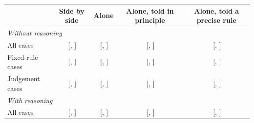 \begin{table}[t]
\centering
\footnotesize
\begin{tabular}{lcccc}
\toprule
 & Side by side & Alone & Alone, told in principle & Alone, told a precise rule \\
\midrule
\multicolumn{5}{l}{\textit{Without reasoning}} \\
All cases & \FirstSessionSideBySideNoReasoning{}\,{\scriptsize[\FirstSessionSideBySideNoReasoningLo{}, \FirstSessionSideBySideNoReasoningHi{}]} & \FirstSessionAloneNoReasoning{}\,{\scriptsize[\FirstSessionAloneNoReasoningLo{}, \FirstSessionAloneNoReasoningHi{}]} & \FirstSessionToldPrincipleNoReasoning{}\,{\scriptsize[\FirstSessionToldPrincipleNoReasoningLo{}, \FirstSessionToldPrincipleNoReasoningHi{}]} & \FirstSessionToldRuleNoReasoning{}\,{\scriptsize[\FirstSessionToldRuleNoReasoningLo{}, \FirstSessionToldRuleNoReasoningHi{}]} \\
Fixed-rule cases & \FirstSessionSideBySideNoReasoningFixedRule{}\,{\scriptsize[\FirstSessionSideBySideNoReasoningFixedRuleLo{}, \FirstSessionSideBySideNoReasoningFixedRuleHi{}]} & \FirstSessionAloneNoReasoningFixedRule{}\,{\scriptsize[\FirstSessionAloneNoReasoningFixedRuleLo{}, \FirstSessionAloneNoReasoningFixedRuleHi{}]} & \FirstSessionToldPrincipleNoReasoningFixedRule{}\,{\scriptsize[\FirstSessionToldPrincipleNoReasoningFixedRuleLo{}, \FirstSessionToldPrincipleNoReasoningFixedRuleHi{}]} & \FirstSessionToldRuleNoReasoningFixedRule{}\,{\scriptsize[\FirstSessionToldRuleNoReasoningFixedRuleLo{}, \FirstSessionToldRuleNoReasoningFixedRuleHi{}]} \\
Judgement cases & \FirstSessionSideBySideNoReasoningJudgement{}\,{\scriptsize[\FirstSessionSideBySideNoReasoningJudgementLo{}, \FirstSessionSideBySideNoReasoningJudgementHi{}]} & \FirstSessionAloneNoReasoningJudgement{}\,{\scriptsize[\FirstSessionAloneNoReasoningJudgementLo{}, \FirstSessionAloneNoReasoningJudgementHi{}]} & \FirstSessionToldPrincipleNoReasoningJudgement{}\,{\scriptsize[\FirstSessionToldPrincipleNoReasoningJudgementLo{}, \FirstSessionToldPrincipleNoReasoningJudgementHi{}]} & \FirstSessionToldRuleNoReasoningJudgement{}\,{\scriptsize[\FirstSessionToldRuleNoReasoningJudgementLo{}, \FirstSessionToldRuleNoReasoningJudgementHi{}]} \\
\multicolumn{5}{l}{\textit{With reasoning}} \\
All cases & \FirstSessionSideBySideReasoning{}\,{\scriptsize[\FirstSessionSideBySideReasoningLo{}, \FirstSessionSideBySideReasoningHi{}]} & \FirstSessionAloneReasoning{}\,{\scriptsize[\FirstSessionAloneReasoningLo{}, \FirstSessionAloneReasoningHi{}]} & \FirstSessionToldPrincipleReasoning{}\,{\scriptsize[\FirstSessionToldPrincipleReasoningLo{}, \FirstSessionToldPrincipleReasoningHi{}]} & \FirstSessionToldRuleReasoning{}\,{\scriptsize[\FirstSessionToldRuleReasoningLo{}, \FirstSessionToldRuleReasoningHi{}]} \\

\end{tabular}
\end{table}
